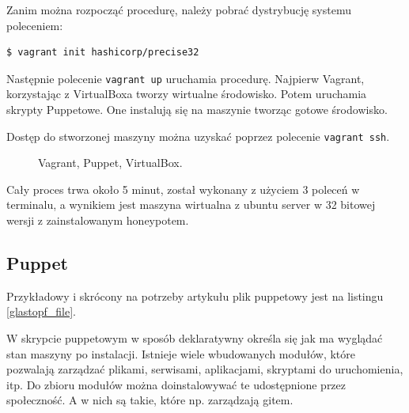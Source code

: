 \documentclass[runningheads,a4paper]{llncs}
\begin{document}
Zanim można rozpocząć procedurę, należy pobrać dystrybucję systemu poleceniem:
\begin{lstlisting}
$ vagrant init hashicorp/precise32
\end{lstlisting}

Następnie polecenie \texttt{vagrant up} uruchamia procedurę. Najpierw Vagrant, korzystając z VirtualBoxa tworzy wirtualne środowisko. Potem uruchamia skrypty Puppetowe. One instalują się na maszynie tworząc gotowe środowisko.

Dostęp do stworzonej maszyny można uzyskać poprzez polecenie \texttt{vagrant ssh}.

\begin{figure}
        \centering
        \caption{Vagrant, Puppet, VirtualBox.}
        \label{fig:vagrant_fig}
\end{figure}

Cały proces trwa około 5 minut, został wykonany z użyciem 3 poleceń w terminalu, a wynikiem jest maszyna wirtualna z ubuntu server w 32 bitowej wersji z zainstalowanym honeypotem.

\subsection*{Puppet}

Przykładowy i skrócony na potrzeby artykułu plik puppetowy jest na listingu \ref{glastopf_file}.

\begin{glastopf_listing}[h]

\end{glastopf_listing}

W skrypcie puppetowym w sposób deklaratywny określa się jak ma wyglądać stan maszyny po instalacji. Istnieje wiele wbudowanych modułów, które pozwalają zarządzać plikami, serwisami, aplikacjami, skryptami do uruchomienia, itp. Do zbioru modułów można doinstalowywać te udostępnione przez społeczność. A w nich są takie, które np. zarządzają gitem.
\end{document}
